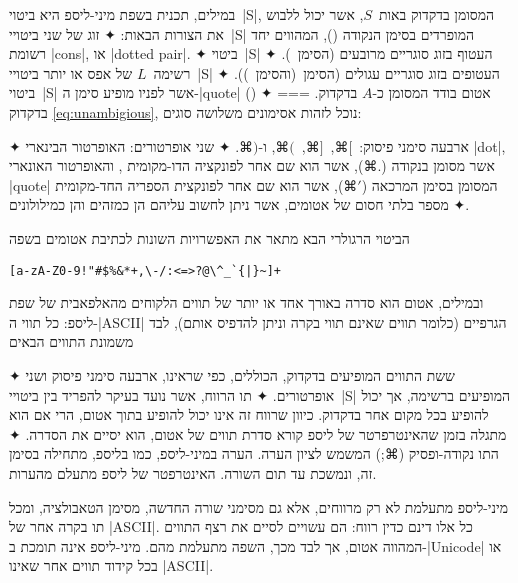 במילים, תכנית בשפת מיני-ליספ היא ביטוי~\E|S|, המסומן בדקדוק באות~$S$, אשר יכול
ללבוש את הצורות הבאות:
✦ זוג של שני ביטויי~\E|S| המופרדים בסימן הנקודה (), המהווים יחד רשומת
  \E|cons|, או \E|dotted pair|.
✦ ביטוי~\E|S| העטוף בזוג סוגריים מרובעים (הסימן~\cc[ והסימן~\cc]).
✦ רשימה~$L$ של אפס או יותר ביטויי~\E|S| העטופים בזוג סוגריים עגולים (הסימן~\cc(והסימן~\cc)).
✦ ביטוי~\E|S| אשר לפניו מופיע סימן ה-\E|quote| ()
✦ אטום בודד המסומן כ-$A$ בדקדוק.
===
בדקדוק \cref{eq:unambigious}, נוכל לזהות אסימונים משלושה סוגים:
\begin{enumerate}
✦ ארבעה סימני פיסוק:~$⌘[$,~$⌘]$,~$⌘($, ו-$⌘)$.
✦ שני אופרטורים: האופרטור הבינארי \E|dot|, אשר מסומן בנקודה ($⌘.$), אשר
  הוא שם אחר לפונקציה הדו-מקומית , והאופרטור האונארי \E|quote|
  המסומן בסימן המרכאה ($⌘'$), אשר הוא שם אחר לפונקצית הספריה החד-מקומית 
✦ מספר בלתי חסום של אטומים, אשר ניתן לחשוב עליהם הן כמזהים והן כמילולונים.
\end{enumerate}

הביטוי הרגולרי הבא מתאר את האפשרויות השונות לכתיבת אטומים בשפה
\begin{LTR}
\begin{verbatim}
[a-zA-Z0-9!"#$%&*+,\-/:<=>?@\^_`{|}~]+
\end{verbatim}
\end{LTR}

ובמילים, אטום הוא סדרה באורך אחד או יותר של תווים הלקוחים מהאלפאבית של שפת ליספ:
כל תווי ה-\E|ASCII| הגרפיים (כלומר תווים שאינם תווי בקרה וניתן להדפיס אותם),
לבד משמונת התווים הבאים \begin{itemize}
    ✦ ששת התווים המופיעים בדקדוק, הכוללים, כפי שראינו, ארבעה סימני פיסוק ושני אופרטורים.
    ✦ תו הרווח, אשר נועד בעיקר להפריד בין ביטויי~\E|S| המופיעים ברשימה, אך יכול
    להופיע בכל מקום אחר בדקדוק. כיוון שרווח זה אינו יכול להופיע בתוך אטום, הרי
    אם הוא מתגלה בזמן שהאינטרפרטר של ליספ קורא סדרת תווים של אטום, הוא יסיים את
    הסדרה.
    ✦ התו נקודה-ופסיק (⌘;) המשמש לציון הערה. הערה במיני-ליספ, כמו בליספ, מתחילה
    בסימן זה, ונמשכת עד תום השורה. האינטרפטר של ליספ מתעלם מהערות.
\end{itemize}
    מיני-ליספ מתעלמת לא רק מרווחים, אלא גם מסימני שורה החדשה, מסימן הטאבולציה,
    ומכל תו בקרה אחר של \E|ASCII|. כל אלו דינם כדין רווח: הם עשויים לסיים את רצף
    התווים המהווה אטום, אך לבד מכך, השפה מתעלמת מהם. מיני-ליספ אינה תומכת
    ב-\E|Unicode| או בכל קידוד תווים אחר שאינו \E|ASCII|.

